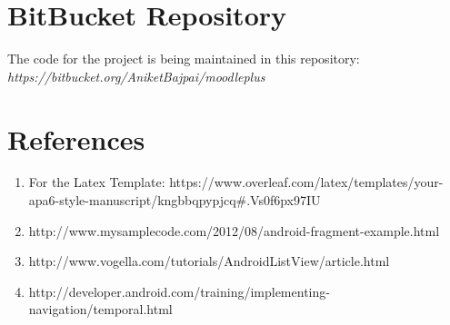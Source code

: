 \documentclass[a4paper,man,natbib]{apa6}
\begin{document}
\section{BitBucket Repository}
\label{sec:examples}
\begin{center}
The code for the project is being maintained in this repository:
 {\em https://bitbucket.org/AniketBajpai/moodleplus}
\end{center}

\section{References}
\label{sec:examples}
\begin{enumerate}
\item For the Latex Template:
https://www.overleaf.com/latex/templates/your-apa6-style-manuscript/kngbbqpypjcq\#.Vs0f6px97IU
\item http://www.mysamplecode.com/2012/08/android-fragment-example.html
\item http://www.vogella.com/tutorials/AndroidListView/article.html
\item http://developer.android.com/training/implementing-navigation/temporal.html

\end{enumerate}
\end{document}
